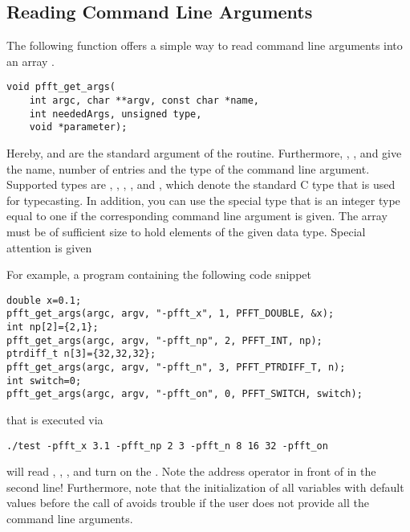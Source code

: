 \subsection{Reading Command Line Arguments}
The following function offers a simple way to read command line arguments into an array .
\begin{lstlisting}
void pfft_get_args(
    int argc, char **argv, const char *name,
    int neededArgs, unsigned type,
    void *parameter);
\end{lstlisting}
Hereby,  and  are the standard argument of the  routine.
Furthermore, , , and  give the name, number of entries and the type of the command line argument.
Supported types are , , , , and ,
which denote the standard C type that is used for typecasting.
In addition, you can use the special type  that is an integer type equal to one if the corresponding command line argument is given.
The array  must be of sufficient size to hold  elements of the given data type.
Special attention is given 

For example, a program containing the following code snippet
\begin{lstlisting}[keywords={double, int, ptrdiff_t}]
double x=0.1;
pfft_get_args(argc, argv, "-pfft_x", 1, PFFT_DOUBLE, &x);
int np[2]={2,1};
pfft_get_args(argc, argv, "-pfft_np", 2, PFFT_INT, np);
ptrdiff_t n[3]={32,32,32};
pfft_get_args(argc, argv, "-pfft_n", 3, PFFT_PTRDIFF_T, n);
int switch=0;
pfft_get_args(argc, argv, "-pfft_on", 0, PFFT_SWITCH, switch);
\end{lstlisting}
that is executed via
\begin{lstlisting}
./test -pfft_x 3.1 -pfft_np 2 3 -pfft_n 8 16 32 -pfft_on
\end{lstlisting}
will read , , , and turn on the .
Note the address operator \code{&} in front of  in the second line!
Furthermore, note that the initialization of all variables with default values before the call of 
avoids trouble if the user does not provide all the command line arguments.

